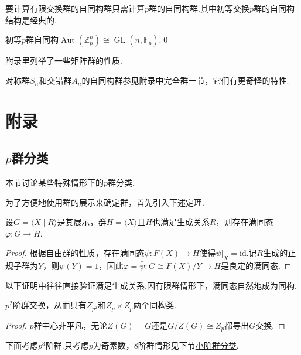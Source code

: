 要计算有限交换群的自同构群只需计算$p$群的自同构群.其中初等交换$p$群的自同构结构是经典的.
\begin{prop}
	初等$p$群自同构$\operatorname*{Aut}(\mathbb{Z}_p^n)\cong\operatorname*{GL}(n,\mathbb{F}_p)$.\qed
\end{prop}
\begin{remark}
	附录里列举了一些矩阵群的性质.
\end{remark}

对称群$S_n$和交错群$A_n$的自同构群参见附录中完全群一节，它们有更奇怪的特性.%

\section{附录}
\subsection{\texorpdfstring{$p$群分类}{p群分类}}
本节讨论某些特殊情形下的$p$群分类.

为了方便地使用群的展示来确定群，首先引入下述定理.
\begin{thm}
	设$G=\langle X\mid R\rangle $是其展示，群$H=\langle X\rangle $且$H$也满足生成关系$R$，则存在满同态$\varphi\colon G\to H$.
\end{thm}
\begin{proof}
	根据自由群的性质，存在满同态$\psi\colon F(X)\to H$使得$\psi|_X=\mathrm{id}$.记$R$生成的正规子群为$Y$，则$\psi(Y)=1$，因此$\varphi=\bar\psi\colon G\cong F(X)/Y\to H$是良定的满同态.
\end{proof}
\begin{remark}
	以下证明中往往直接验证满足生成关系.因有限群情形下，满同态自然地成为同构.
\end{remark}

\begin{prop}
	$p^2$阶群交换，从而只有$Z_{p^2}$和$Z_p\times Z_p$两个同构类.
\end{prop}
\begin{proof}
	$p$群中心非平凡，无论$Z(G)=G$还是$G/Z(G)\cong Z_p$都导出$G$交换.
\end{proof}

下面考虑$p^3$阶群.只考虑$p$为奇素数，$8$阶群情形见下节\hyperref[subsec:ClassificationSmallOrder]{小阶群分类}.

